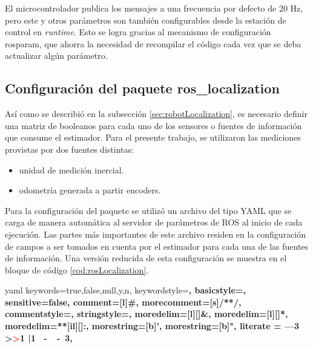 El microcontrolador publica los mensajes a una frecuencia por defecto de 20 Hz, pero este y otros parámetros son también configurables desde la estación de control en \textit{runtime}. Esto se logra gracias al mecanismo de configuración rosparam, que ahorra la necesidad de recompilar el código cada vez que se deba actualizar algún parámetro.

\subsection{Configuración del paquete ros\_localization}

Así como se describió en la subsección \ref{sec:robotLocalization}, es necesario definir una matriz de booleanos para cada uno de los sensores o fuentes de información que consume el estimador. Para el presente trabajo, se utilizaron las mediciones provistas por dos fuentes distintas:

\begin{itemize}
  \item unidad de medición inercial.
  \item odometría generada a partir encoders.
\end{itemize}

Para la configuración del paquete se utilizó un archivo del tipo YAML que se carga de manera automática al servidor de parámetros de ROS al inicio de cada ejecución. Las partes más importantes de este archivo residen en la configuración de campos a ser tomados en cuenta por el estimador para cada una de las fuentes de información. Una versión reducida de esta configuración se muestra en el bloque de código \ref{cod:rosLocalization}.

\newpage

\newcommand\YAMLcolonstyle{\color{green}\mdseries}
\newcommand\YAMLkeystyle{\color{black}\bfseries}
\newcommand\YAMLvaluestyle{\color{blue}\mdseries}

\makeatletter

\newcommand\language@yaml{yaml}

\expandafter\expandafter\expandafter\lstdefinelanguage
\expandafter{\language@yaml}
{
keywords={true,false,null,y,n},
keywordstyle=\color{darkgray}\bfseries,
basicstyle=\YAMLkeystyle,                                 %
sensitive=false,
comment=[l]{\#},
morecomment=[s]{/*}{*/},
commentstyle=\color{mygreen}\ttfamily,
stringstyle=\YAMLvaluestyle\ttfamily,
moredelim=[l][\color{orange}]{\&},
moredelim=[l][\color{magenta}]{*},
moredelim=**[il][\YAMLcolonstyle{:}\YAMLvaluestyle]{:},   %
morestring=[b]',
morestring=[b]",
literate =    {---}{{\ProcessThreeDashes}}3
{>}{{\textcolor{red}\textgreater}}1
{|}{{\textcolor{red}\textbar}}1
{\ -\ }{{\mdseries\ -\ }}3,
}

